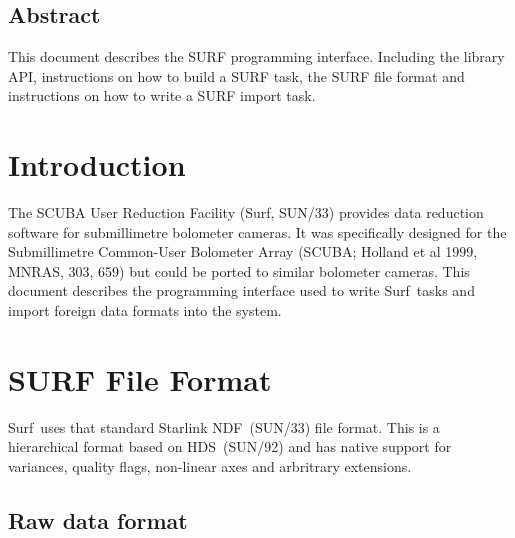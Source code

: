 \documentclass[twoside,11pt]{article}
\newcommand{\stardocinitials}  {SSN}
\newcommand{\stardocnumber}    {72.1}
\newcommand{\stardocabstract}  {This document describes the SURF programming
interface. Including the library API, instructions on how to build
a SURF task, the SURF file format and instructions on how to write
a SURF import task.}
\newcommand{\ndf}{\xref{NDF}{sun33}{}}
\newcommand{\hds}{\xref{HDS}{sun92}{}}
\newcommand{\surfref}{\xref{{\scusoft}}{sun190}{}}
\newcommand{\scusoft}          {{\sc Surf}}
\newcommand{\stardocname}{\stardocinitials /\stardocnumber}
\newenvironment{latexonly}{}{}
\newcommand{\xref}[3]{#1}
\newcommand{\xlabel}[1]{}
\renewcommand{\_}{\texttt{\symbol{95}}}
\renewcommand{\thepage}{\roman{page}}
\begin{document}
\begin{htmlonly}
  \section{\xlabel{abstract}Abstract}

\end{htmlonly}

\stardocabstract
  \newpage
  \begin{latexonly}
    \setlength{\parskip}{0mm}
    \tableofcontents
    \setlength{\parskip}{\medskipamount}
    \markboth{\stardocname}{\stardocname}
  \end{latexonly}
\cleardoublepage
\renewcommand{\thepage}{\arabic{page}}
\setcounter{page}{1}


\section{Introduction}

The SCUBA User Reduction Facility (\surfref, SUN/33) provides data reduction 
software for submillimetre bolometer cameras. It was specifically designed for 
the Submillimetre Common-User Bolometer Array (SCUBA; Holland et al 1999,
MNRAS, 303, 659) but could be ported to similar bolometer cameras. This
document describes the programming interface used to write \scusoft\ tasks and 
import foreign data formats into the system.


\section{SURF File Format}

\scusoft\ uses that standard Starlink \ndf\ (SUN/33) file format. This 
is a hierarchical format based on \hds\ (SUN/92) and has native support for 
variances, quality flags, non-linear axes and arbritrary extensions.

\subsection{Raw data format\label{sec:raw}}
\end{document}
